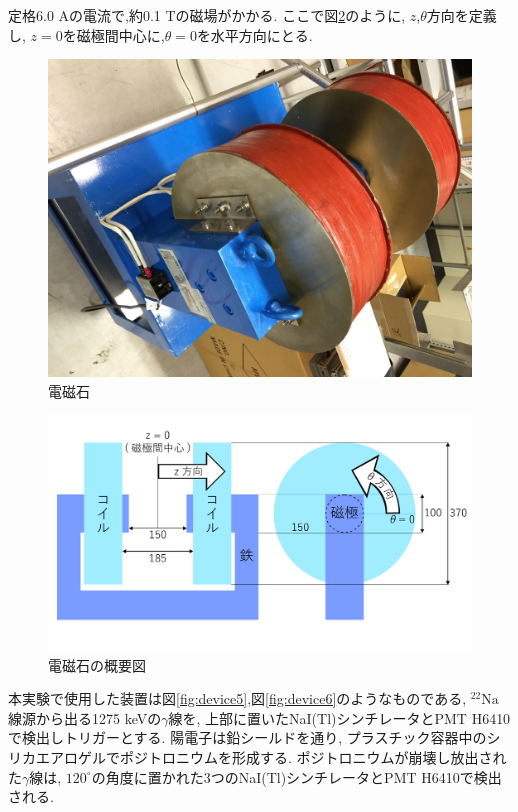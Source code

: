 定格6.0 Aの電流で,約0.1 Tの磁場がかかる.
ここで図\ref{fig:magnet}のように,
$z$,$\theta$方向を定義し,
$z=0$を磁極間中心に,$\theta=0$を水平方向にとる.


\begin{figure}[H]
\centering
\includegraphics[keepaspectratio,angle=90,scale=0.4]{fig/ybm/mag.pdf}
\caption{電磁石}
\label{fig:mag}
\end{figure}

\begin{figure}[H]
\centering
\includegraphics[keepaspectratio,scale=0.25]{fig/ybm/magnet.pdf}
\caption{電磁石の概要図}
\label{fig:magnet}
\end{figure}

本実験で使用した装置は図\ref{fig:device5},図\ref{fig:device6}のようなものである,
$\mathrm{^{22}Na}$線源から出る1275 keVの$\gamma$線を,
上部に置いたNaI(Tl)シンチレータとPMT H6410で検出しトリガーとする.
陽電子は鉛シールドを通り,
プラスチック容器中のシリカエアロゲルでポジトロニウムを形成する.
ポジトロニウムが崩壊し放出された$\gamma$線は,
$120^{\circ}$の角度に置かれた3つのNaI(Tl)シンチレータとPMT H6410で検出される.

